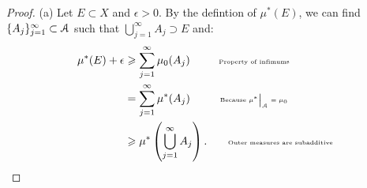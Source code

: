\documentclass[10pt,twoside,openany]{memoir}
\begin{document}
    \begin{proof}
        (a) Let $E \subset X$ and $\epsilon > 0$. By the defintion of $\mu^\ast(E)$, we can find $\{A_j\}_{j = 1}^\infty \subset \mathcal{A}$ such that $\bigcup_{j = 1}^\infty A_j \supset E$ and: 
            \begin{equation*}
            \begin{split}
                \mu^\ast(E) + \epsilon 
                & \geq \sum_{j = 1}^\infty \mu_0(A_j) \h9\h9\h8\text{\tiny Property of infimums}\\ 
                & = \sum_{j = 1}^\infty \mu^\ast (A_j) \h9\h9\h9 \text{\tiny Because $\restr{\mu^\ast}{\cA} = \mu_0$}\\
                & \geq \mu^\ast \left( \bigcup_{j = 1}^\infty A_j \right). \h9\h9\h1\text{\tiny Outer measures are subadditive}
            \end{split}
            \end{equation*}


\end{proof}
\end{document}
